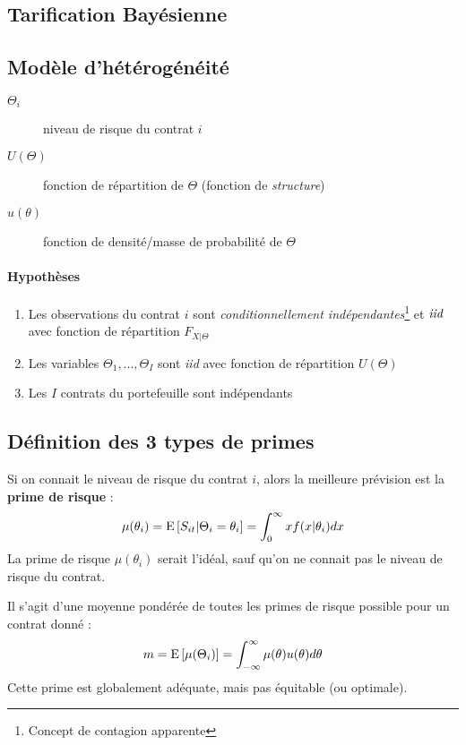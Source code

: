 \documentclass[10pt, french]{article}
\begin{document}
\begin{multicols*}{3}
\section{Tarification Bayésienne}
\subsection*{Modèle d'hétérogénéité}
\begin{description}
\item[$\Theta_i$] niveau de risque du contrat $i$
\item[$U(\Theta)$] fonction de répartition de $\Theta$ (fonction de \emph{structure})
\item[$u(\theta)$] fonction de densité/masse de probabilité de $\Theta$
\end{description}
\paragraph{Hypothèses}
\begin{enumerate}
\item Les observations du contrat $i$ sont \emph{conditionnellement indépendantes}\footnote{Concept de contagion apparente} et $\emph{iid}$ avec fonction de répartition $F_{X|\Theta}$
\item Les variables $\Theta_1, ..., \Theta_I$ sont \emph{iid} avec fonction de répartition $U(\Theta)$
\item Les $I$ contrats du portefeuille sont indépendants
\end{enumerate}

\subsection*{Définition des 3 types de primes}
\begin{definition}
Si on connait le niveau de risque du contrat $i$, alors la meilleure prévision est la \textbf{prime de risque} : 
\begin{equation}
\mu(\theta_i) = \mathrm{E} \left[ S_{it} | \Theta_i = \theta_i \right] = \int_{0}^{\infty} x f(x | \theta_i) dx
\end{equation}
La prime de risque $\mu(\theta_i)$ serait l'idéal, sauf qu'on ne connait pas le niveau de risque du contrat.
\end{definition}

\begin{definition}
Il s'agit d'une moyenne pondérée de toutes les primes de risque possible pour un contrat donné : 
\begin{equation}
m = \mathrm{E} \left[ \mu(\Theta_i) \right] = \int_{-\infty}^{\infty} \mu(\theta) u(\theta) d\theta
\end{equation}
Cette prime est globalement adéquate, mais pas équitable (ou optimale).
\end{definition}


\end{multicols*}
\end{document}
